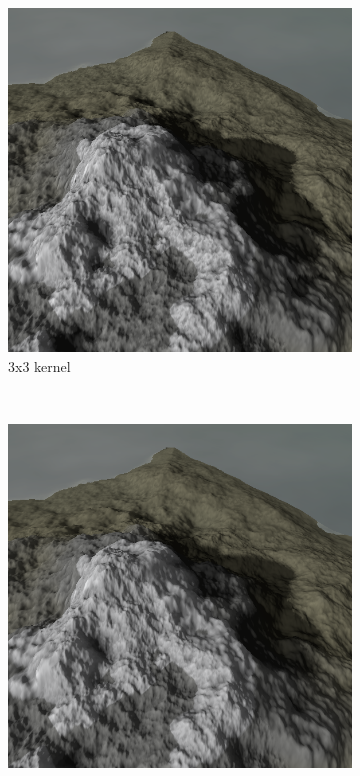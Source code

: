 \documentclass{article}
\begin{document}
\begin{figure}[H]
\centering
    \begin{subfigure}[b]{0.45\textwidth}
        \centering
        \includegraphics[scale=0.25]{shadowFilter1}
        \caption{3x3 kernel}
        \label{fig:shadowFilter1}
    \end{subfigure}
    ~
    \begin{subfigure}[b]{0.45\textwidth}
        \centering
        \includegraphics[scale=0.25]{shadowFilter2}

\end{subfigure}
\end{figure}
\end{document}
